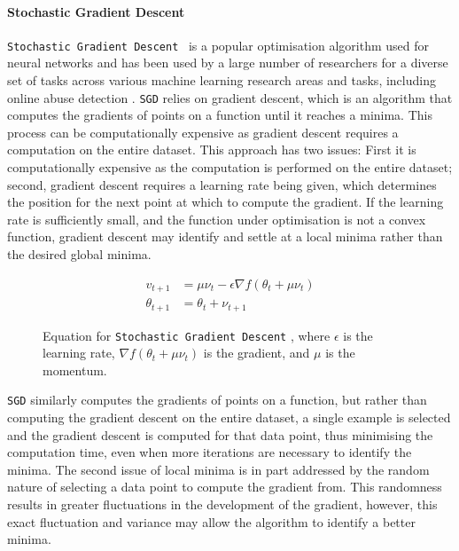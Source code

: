 \paragraph{Stochastic Gradient Descent}
\texttt{Stochastic Gradient Descent}~\citep{Sutskever:2013} is a popular optimisation algorithm used for neural networks and has been used by a large number of researchers for a diverse set of tasks across various machine learning research areas and tasks, including online abuse detection \citep{Singh:2018,Bodapati:2019}. \texttt{SGD} relies on gradient descent, which is an algorithm that computes the gradients of points on a function until it reaches a minima. This process can be computationally expensive as gradient descent requires a computation on the entire dataset. This approach has two issues: First it is computationally expensive as the computation is performed on the entire dataset; second, gradient descent requires a learning rate being given, which determines the position for the next point at which to compute the gradient. If the learning rate is sufficiently small, and the function under optimisation is not a convex function, gradient descent may identify and settle at a local minima rather than the desired global minima.

\begin{figure}[h]
  \begin{align}\label{eq:sgd}
    v_{t+1} &= \mu \nu_t - \epsilon \nabla f(\theta_t + \mu \nu_t)\\
    \theta_{t+1} &= \theta_t + \nu_{t+1}
  \end{align}
  \caption[Equation for \texttt{Stochastic Gradient Descent}]{Equation for \texttt{Stochastic Gradient Descent} \citep{Sutskever:2014}, where $\epsilon$ is the learning rate, $\nabla f(\theta_t + \mu\nu_t)$ is the gradient, and $\mu$ is the momentum.}
\end{figure}

\texttt{SGD} similarly computes the gradients of points on a function, but rather than computing the gradient descent on the entire dataset, a single example is selected and the gradient descent is computed for that data point, thus minimising the computation time, even when more iterations are necessary to identify the minima. The second issue of local minima is in part addressed by the random nature of selecting a data point to compute the gradient from. This randomness results in greater fluctuations in the development of the gradient, however, this exact fluctuation and variance may allow the algorithm to identify a better minima.

